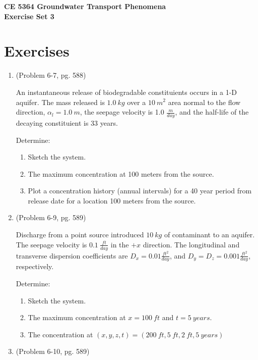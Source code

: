 \documentclass[12pt]{article}
\begin{document}
\begin{center}
{\textbf{{ CE 5364 Groundwater Transport Phenomena } \\ {Exercise Set 3}}}
\end{center}

\section*{\small{Exercises}}
\begin{enumerate} %


\item (Problem 6-7, pg. 588)

An instantaneous release of biodegradable constituients occurs in a 1-D aquifer. The mass released is $1.0 ~kg$ over a $10~m^2$ area normal to the flow direction, $\alpha_l = 1.0~m$, the seepage velocity is 1.0 $\frac{m}{day}$, and the half-life of the decaying constituient is 33 years.

Determine:
\begin{enumerate} %
\item Sketch the system.
\item The maximum concentration at 100 meters from the source.
\item Plot a concentration history (annual intervals) for a 40 year period from release date for a location 100 meters from the source.
\end{enumerate} %

\item (Problem 6-9, pg. 589)

Discharge from a point source introduced $10~kg$ of contaminant to an aquifer. The seepage velocity is $0.1~\frac{ft}{day}$ in the $+x$ direction.  The longitudinal and transverse dispersion coefficients are $D_x = 0.01 \frac{ft^2}{day}$, and $D_y = D_z = 0.001 \frac{ft^2}{day}$, respectively.

Determine:
\begin{enumerate} %
\item Sketch the system.
\item The maximum concentration at $x=100~ft$ and $t=5~years$.
\item The concentration at $(x,y,z,t) = (200~ft,5~ft,2~ft,5~years)$
\end{enumerate} %
\item (Problem 6-10, pg. 589)


\end{enumerate}
\end{document}
